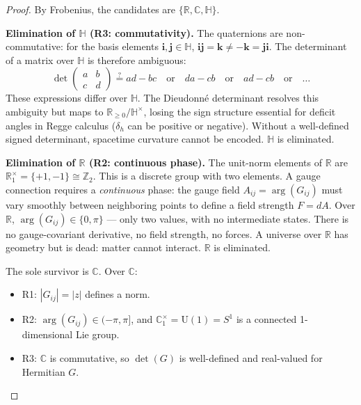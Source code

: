 \begin{proof}
By Frobenius, the candidates are $\{\mathbb{R}, \mathbb{C}, \mathbb{H}\}$.

\medskip
\noindent\textbf{Elimination of $\mathbb{H}$ (R3: commutativity).}
The quaternions are non-commutative: for the basis elements $\mathbf{i}, \mathbf{j} \in \mathbb{H}$, $\mathbf{i}\mathbf{j} = \mathbf{k} \neq -\mathbf{k} = \mathbf{j}\mathbf{i}$. The determinant of a matrix over $\mathbb{H}$ is therefore ambiguous:
\begin{equation}
\det\begin{pmatrix} a & b \\ c & d \end{pmatrix} \stackrel{?}{=} ad - bc \quad\text{or}\quad da - cb \quad\text{or}\quad ad - cb \quad\text{or}\quad \ldots
\end{equation}
These expressions differ over $\mathbb{H}$. The Dieudonn\'e determinant resolves this ambiguity but maps to $\mathbb{R}_{\geq 0}/\mathbb{H}^\times$, losing the sign structure essential for deficit angles in Regge calculus ($\delta_h$ can be positive or negative). Without a well-defined signed determinant, spacetime curvature cannot be encoded. $\mathbb{H}$ is eliminated.

\medskip
\noindent\textbf{Elimination of $\mathbb{R}$ (R2: continuous phase).}
The unit-norm elements of $\mathbb{R}$ are $\mathbb{R}^\times_1 = \{+1, -1\} \cong \mathbb{Z}_2$. This is a discrete group with two elements. A gauge connection requires a \emph{continuous} phase: the gauge field $A_{ij} = \arg(G_{ij})$ must vary smoothly between neighboring points to define a field strength $F = dA$. Over $\mathbb{R}$, $\arg(G_{ij}) \in \{0, \pi\}$ --- only two values, with no intermediate states. There is no gauge-covariant derivative, no field strength, no forces. A universe over $\mathbb{R}$ has geometry but is dead: matter cannot interact. $\mathbb{R}$ is eliminated.

\medskip
The sole survivor is $\mathbb{C}$. Over $\mathbb{C}$:
\begin{itemize}
\item R1: $|G_{ij}| = |z|$ defines a norm. \checkmark
\item R2: $\arg(G_{ij}) \in (-\pi, \pi]$, and $\mathbb{C}^\times_1 = \text{U}(1) = S^1$ is a connected 1-dimensional Lie group. \checkmark
\item R3: $\mathbb{C}$ is commutative, so $\det(G)$ is well-defined and real-valued for Hermitian $G$. \checkmark \qedhere
\end{itemize}
\end{proof}

